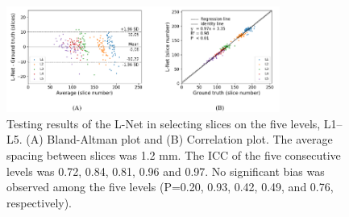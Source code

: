 \begin{figure}[tb]
    \centering
    \includegraphics[width=0.8\textwidth]{figure6.png}
    \caption{Testing results of the L-Net in selecting slices on the five levels, L1–L5. (A) Bland-Altman plot and (B) Correlation plot. The average spacing between slices was 1.2 mm. The ICC of the five consecutive levels was 0.72, 0.84, 0.81, 0.96 and 0.97. No significant bias was observed among the five levels (P=0.20, 0.93, 0.42, 0.49, and 0.76, respectively).}
    \label{fig6}
\end{figure}

